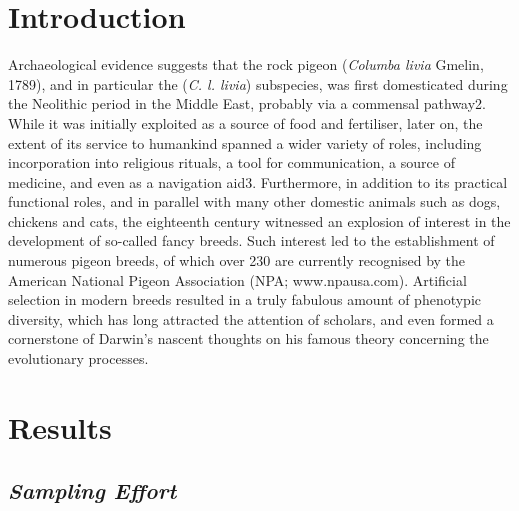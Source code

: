 \documentclass[a4paper]{article}
\begin{document}
\newpage


\section{Introduction}

Archaeological evidence suggests that the rock pigeon (\textit{Columba livia} Gmelin, 1789), and in particular the (\textit{C. l. livia}) subspecies, was first domesticated during the Neolithic period in the Middle East, probably via a commensal pathway2. While it was initially exploited as a source of food and fertiliser, later on, the extent of its service to humankind spanned a wider variety of roles, including incorporation into religious rituals, a tool for communication, a source of medicine, and even as a navigation aid3. Furthermore, in addition to its practical functional roles, and in parallel with many other domestic animals such as dogs, chickens and cats, the eighteenth century witnessed an explosion of interest in the development of so-called fancy breeds. Such interest led to the establishment of numerous pigeon breeds, of which over 230 are currently recognised by the American National Pigeon Association (NPA; www.npausa.com). Artificial selection in modern breeds resulted in a truly fabulous amount of phenotypic diversity, which has long attracted the attention of scholars, and even formed a cornerstone of Darwin’s nascent thoughts on his famous theory concerning the evolutionary processes.



\section{Results}

\subsection{\textit{Sampling Effort}}
\end{document}
